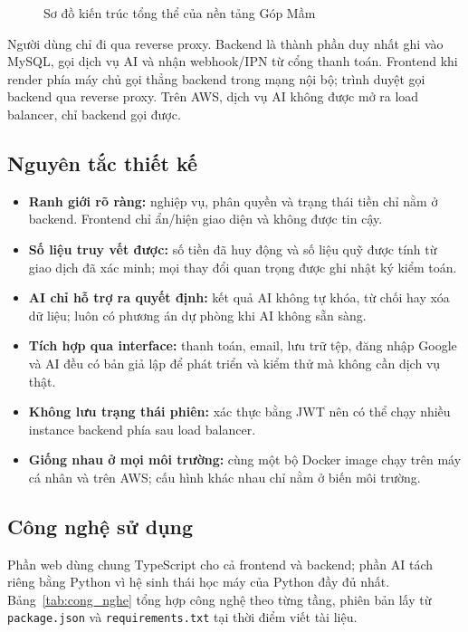 \begin{figure}[htbp]
{%
    }
    \caption{Sơ đồ kiến trúc tổng thể của nền tảng Góp Mầm}
    \label{fig:kien_truc_tong_the}
\end{figure}

Người dùng chỉ đi qua reverse proxy. Backend là thành phần duy nhất ghi vào MySQL, gọi dịch vụ AI và nhận webhook/IPN từ cổng thanh toán. Frontend khi render phía máy chủ gọi thẳng backend trong mạng nội bộ; trình duyệt gọi backend qua reverse proxy. Trên AWS, dịch vụ AI không được mở ra load balancer, chỉ backend gọi được.

\subsection{Nguyên tắc thiết kế}

\begin{itemize}
    \item \textbf{Ranh giới rõ ràng:} nghiệp vụ, phân quyền và trạng thái tiền chỉ nằm ở backend. Frontend chỉ ẩn/hiện giao diện và không được tin cậy.
    \item \textbf{Số liệu truy vết được:} số tiền đã huy động và số liệu quỹ được tính từ giao dịch đã xác minh; mọi thay đổi quan trọng được ghi nhật ký kiểm toán.
    \item \textbf{AI chỉ hỗ trợ ra quyết định:} kết quả AI không tự khóa, từ chối hay xóa dữ liệu; luôn có phương án dự phòng khi AI không sẵn sàng.
    \item \textbf{Tích hợp qua interface:} thanh toán, email, lưu trữ tệp, đăng nhập Google và AI đều có bản giả lập để phát triển và kiểm thử mà không cần dịch vụ thật.
    \item \textbf{Không lưu trạng thái phiên:} xác thực bằng JWT nên có thể chạy nhiều instance backend phía sau load balancer.
    \item \textbf{Giống nhau ở mọi môi trường:} cùng một bộ Docker image chạy trên máy cá nhân và trên AWS; cấu hình khác nhau chỉ nằm ở biến môi trường.
\end{itemize}

\subsection{Công nghệ sử dụng}

Phần web dùng chung TypeScript cho cả frontend và backend; phần AI tách riêng bằng Python vì hệ sinh thái học máy của Python đầy đủ nhất. Bảng~\ref{tab:cong_nghe} tổng hợp công nghệ theo từng tầng, phiên bản lấy từ \texttt{package.json} và \texttt{requirements.txt} tại thời điểm viết tài liệu.

